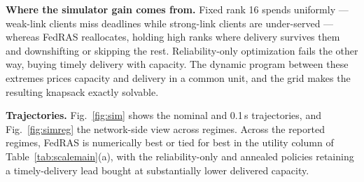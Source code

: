 \documentclass[a4paper,fleqn]{cas-dc}
\begin{document}
\textbf{Where the simulator gain comes from.} Fixed rank 16 spends uniformly --- weak-link clients miss deadlines while strong-link clients are under-served --- whereas FedRAS reallocates, holding high ranks where delivery survives them and downshifting or skipping the rest. Reliability-only optimization fails the other way, buying timely delivery with capacity. The dynamic program between these extremes prices capacity and delivery in a common unit, and the grid makes the resulting knapsack exactly solvable.

\textbf{Trajectories.} Fig.~\ref{fig:sim} shows the nominal and 0.1\,s trajectories, and Fig.~\ref{fig:simreg} the network-side view across regimes. Across the reported regimes, FedRAS is numerically best or tied for best in the utility column of Table~\ref{tab:scalemain}(a), with the reliability-only and annealed policies retaining a timely-delivery lead bought at substantially lower delivered capacity.
\end{document}
